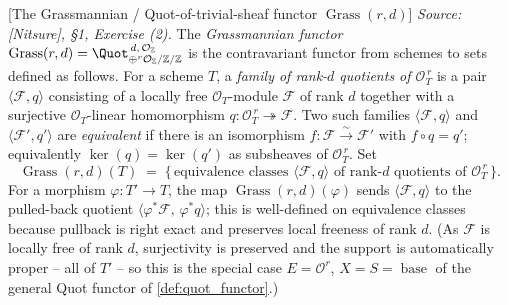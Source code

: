 \begin{definition}

[The Grassmannian / Quot-of-trivial-sheaf functor \(\operatorname{Grass}(r,d)\)]
  \label{def:grassmannian_functor}
  \textit{Source: [Nitsure], \S 1, Exercise (2).}
  The \emph{Grassmannian functor}
  \(\operatorname{Grass}(r,d) = \Quot^{\,d,\,\mathcal{O}_{\mathbb{Z}}}_{\oplus^{r}
  \mathcal{O}_{\mathbb{Z}}/\mathbb{Z}/\mathbb{Z}}\) is the contravariant functor
  from schemes to sets defined as follows. For a scheme \(T\), a \emph{family of
  rank-\(d\) quotients of \(\mathcal{O}_T^{\,r}\)} is a pair
  \(\langle \mathcal{F}, q \rangle\) consisting of a locally free
  \(\mathcal{O}_T\)-module \(\mathcal{F}\) of rank \(d\) together with a surjective
  \(\mathcal{O}_T\)-linear homomorphism \(q : \mathcal{O}_T^{\,r}
  \twoheadrightarrow \mathcal{F}\). Two such families
  \(\langle \mathcal{F}, q \rangle\) and \(\langle \mathcal{F}', q' \rangle\) are
  \emph{equivalent} if there is an isomorphism \(f : \mathcal{F}
  \xrightarrow{\sim} \mathcal{F}'\) with \(f \circ q = q'\); equivalently
  \(\ker(q) = \ker(q')\) as subsheaves of \(\mathcal{O}_T^{\,r}\). Set
  \[
    \operatorname{Grass}(r,d)(T)
      \;=\; \bigl\{\, \text{equivalence classes } \langle \mathcal{F}, q \rangle
        \text{ of rank-}d\text{ quotients of } \mathcal{O}_T^{\,r} \,\bigr\}.
  \]
  For a morphism \(\varphi : T' \to T\), the map
  \(\operatorname{Grass}(r,d)(\varphi)\) sends \(\langle \mathcal{F}, q \rangle\)
  to the pulled-back quotient \(\langle \varphi^{*}\mathcal{F},\, \varphi^{*}q
  \rangle\); this is well-defined on equivalence classes because pullback is right
  exact and preserves local freeness of rank \(d\). (As \(\mathcal{F}\) is locally
  free of rank \(d\), surjectivity is preserved and the support is automatically
  proper -- all of \(T'\) -- so this is the special case
  \(E = \mathcal{O}^{r}\), \(X = S = \operatorname{base}\) of the general Quot
  functor of \cref{def:quot_functor}.)
\end{definition}

